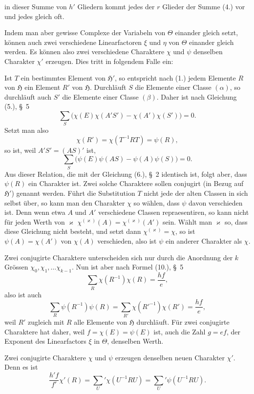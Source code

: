 \documentclass[11pt]{article}
\newcommand{\grp}{\mathfrak{H}}
\begin{document}
in dieser Summe von $h'$ Gliedern kommt jedes der $r$ Glieder der Summe (4.) vor und jedes gleich oft.

Indem man aber gewisse Complexe der Variabeln von $\Theta$ einander gleich setzt, können auch zwei verschiedene Linearfactoren $\xi$ und $\eta$ von $\Theta$ einander gleich werden. Es können also zwei verschiedene Charaktere $\chi$ und $\psi$ denselben Charakter $\chi'$ erzeugen. Dies tritt in folgendem Falle ein:

Ist $T$ ein bestimmtes Element von $\grp'$, so entspricht nach (1.) jedem Elemente $R$ von $\grp$ ein Element $R'$ von $\grp$. Durchläuft $S$ die Elemente einer Classe $(\alpha)$, so durchläuft auch $S'$ die Elemente einer Classe $(\beta)$. Daher ist nach Gleichung (5.), \S~5
\[
\sum_S\bigl(\chi(E)\chi(A'S')-\chi(A')\chi(S')\bigr)=0.
\]
Setzt man also
\[
\chi(R')=\chi(T^{-1}RT)=\psi(R),
\]
so ist, weil $A'S'=(AS)'$ ist,
\[
\sum_S\bigl(\psi(E)\psi(AS)-\psi(A)\psi(S)\bigr)=0.
\]
Aus dieser Relation, die mit der Gleichung (6.), \S~2 identisch ist, folgt aber, dass $\psi(R)$ ein Charakter ist. Zwei solche Charaktere sollen conjugirt (in Bezug auf $\grp'$) genannt werden. Führt die Substitution $T$ nicht jede der alten Classen in sich selbst über, so kann man den Charakter $\chi$ so wählen, dass $\psi$ davon verschieden ist. Denn wenn etwa $A$ und $A'$ verschiedene Classen repraesentiren, so kann nicht für jeden Werth von $\varkappa$ $\chi^{(\varkappa)}(A)=\chi^{(\varkappa)}(A')$ sein. Wählt man $\varkappa$ so, dass diese Gleichung nicht besteht, und setzt dann $\chi^{(\varkappa)}=\chi$, so ist $\psi(A)=\chi(A')$ von $\chi(A)$ verschieden, also ist $\psi$ ein anderer Charakter als $\chi$.

Zwei conjugirte Charaktere unterscheiden sich nur durch die Anordnung der $k$ Grössen $\chi_0,\chi_1,\ldots \chi_{k-1}$. Nun ist aber nach Formel (10.), \S~5
\begin{equation*}\tag{6.}
\sum_R \chi(R^{-1})\chi(R)=\frac{hf}{e},
\end{equation*}
also ist auch
\[
\sum_R \psi(R^{-1})\psi(R)=\sum_{R'}\chi(R'^{-1})\chi(R')=\frac{hf}{e},
\]
weil $R'$ zugleich mit $R$ alle Elemente von $\grp$ durchläuft. Für zwei conjugirte Charaktere hat daher, weil $f=\chi(E)=\psi(E)$ ist, auch die Zahl $g=ef$, der Exponent des Linearfactors $\xi$ in $\Theta$, denselben Werth.

Zwei conjugirte Charaktere $\chi$ und $\psi$ erzeugen denselben neuen Charakter $\chi'$. Denn es ist
\begin{equation*}\tag{7.}
\frac{h'f}{f'}\chi'(R)=\sum_U'\chi(U^{-1}RU)=\sum_U'\psi(U^{-1}RU).
\end{equation*}
\end{document}
